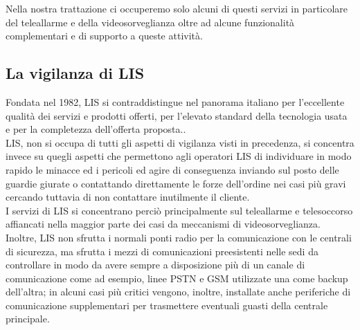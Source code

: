 Nella nostra trattazione ci occuperemo solo alcuni di questi servizi in particolare del teleallarme e della videosorveglianza oltre ad alcune funzionalità complementari e di supporto a queste attività.
\subsection{La vigilanza di LIS}
Fondata nel 1982, LIS si contraddistingue nel panorama italiano per l'eccellente qualità dei servizi e prodotti offerti, per l'elevato standard della tecnologia usata e per la completezza dell'offerta proposta.\cite{lis:chisiamo}.\\
LIS, non si occupa di tutti gli aspetti di vigilanza visti in precedenza, si concentra invece su quegli aspetti che permettono agli operatori LIS di individuare in modo rapido le minacce ed i pericoli ed agire di conseguenza inviando sul posto delle guardie giurate o contattando direttamente le forze dell'ordine nei casi più gravi cercando tuttavia di non contattare inutilmente il cliente.\\
I servizi di LIS si concentrano perciò principalmente sul teleallarme e telesoccorso affiancati nella maggior parte dei casi da meccanismi di videosorveglianza. Inoltre, LIS non sfrutta i normali ponti  radio per la comunicazione con le centrali di sicurezza, ma sfrutta i mezzi di comunicazioni preesistenti nelle sedi da controllare in modo da avere sempre a disposizione più di un canale di comunicazione come ad esempio, linee PSTN e GSM utilizzate una come backup dell'altra; in alcuni casi più critici vengono, inoltre, installate anche periferiche di comunicazione supplementari per trasmettere eventuali guasti della centrale principale.
